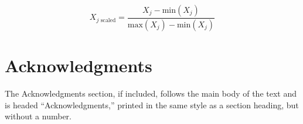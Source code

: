 \documentclass[a4paper,11pt]{article}
\begin{document}
\begin{equation}
	X_{j \text{ scaled}} = \frac{X_{j}-\text{min}(X_{j})}{\text{max}(X_{j})-\text{min}(X_{j})}
\end{equation}

\section*{Acknowledgments}

The Acknowledgments section, if included,
		       follows the main body of the text and is headed
		       ``Acknowledgments,'' printed in the same style
		       as a section heading, but without a number.




\end{document}
